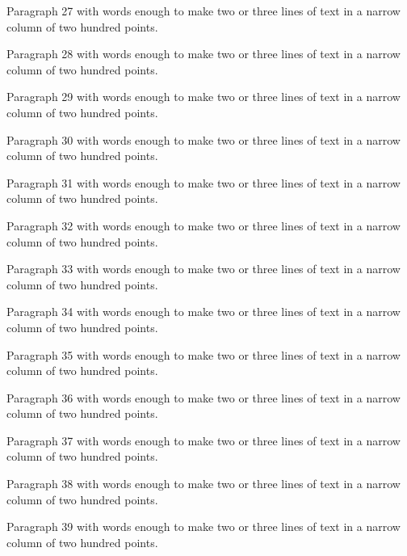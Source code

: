 Paragraph 27 with words enough to make two or three lines of text in a narrow column of two hundred points.\par{} \vbox{}
Paragraph 28 with words enough to make two or three lines of text in a narrow column of two hundred points.\par{} \vbox{}
Paragraph 29 with words enough to make two or three lines of text in a narrow column of two hundred points.\par{} \vbox{}
Paragraph 30 with words enough to make two or three lines of text in a narrow column of two hundred points.\par{} \vbox{}
Paragraph 31 with words enough to make two or three lines of text in a narrow column of two hundred points.\par{} \vbox{}
Paragraph 32 with words enough to make two or three lines of text in a narrow column of two hundred points.\par{} \vbox{}
Paragraph 33 with words enough to make two or three lines of text in a narrow column of two hundred points.\par{} \vbox{}
Paragraph 34 with words enough to make two or three lines of text in a narrow column of two hundred points.\par{} \vbox{}
Paragraph 35 with words enough to make two or three lines of text in a narrow column of two hundred points.\par{} \vbox{}
Paragraph 36 with words enough to make two or three lines of text in a narrow column of two hundred points.\par{} \vbox{}
Paragraph 37 with words enough to make two or three lines of text in a narrow column of two hundred points.\par{} \vbox{}
Paragraph 38 with words enough to make two or three lines of text in a narrow column of two hundred points.\par{} \vbox{}
Paragraph 39 with words enough to make two or three lines of text in a narrow column of two hundred points.\par{} \vbox{}
\bye
